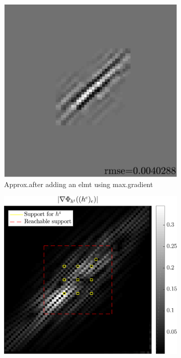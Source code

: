 \begin{figure} \ContinuedFloat
\begin{subfigure}[b]{0.28\linewidth}\centering
\includegraphics[width=0.94\linewidth]{figures/before_after/gradafter_approx.pdf}
\caption{Approx.\@ after adding an elmt using max.\@ gradient}\label{fig_beforeafter-aftergradadd-approx}
\end{subfigure}
\begin{subfigure}[b]{0.34\linewidth}\centering
\includegraphics[width=\linewidth]{figures/before_after/gradafter_partgrad4.pdf}

\end{subfigure}
\end{figure}

